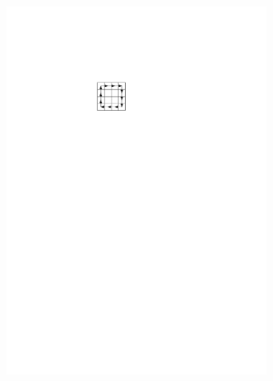 \documentclass[letterpaper]{article}
\theoremstyle{definition}
\begin{document}
\begin{figure}[t]
\begin{subfigure}[b]{0.12\textwidth}
	\includegraphics[width=0.95\textwidth]{Figs/example1_EG.pdf}
    \caption{}
  \end{subfigure}
  \begin{subfigure}[b]{0.12\textwidth}
    \centering

\end{subfigure}
\end{figure}
\end{document}
